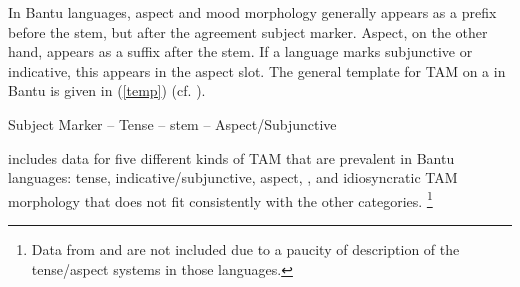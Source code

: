 \documentclass[output=paper,
modfonts
]{langscibook}
\begin{document}
  In Bantu languages, aspect and mood morphology generally appears as a prefix before the  stem, but after the agreement subject marker.  Aspect, on the other hand, appears as a suffix after the  stem. If a language marks subjunctive or indicative, this appears in the aspect slot. The general template for TAM on a  in Bantu is given in (\ref{temp}) (cf. \citealt{Meeussen1967,Nurse2003}).
  \begin{exe}
\ex\label{temp} Subject Marker -- Tense -- {\sc stem} -- Aspect/Subjunctive
\end{exe}
%
 includes data for five different kinds of TAM that are prevalent in Bantu languages: tense, indicative/subjunctive, aspect, , and idiosyncratic TAM morphology that does not fit consistently with the other categories.%
\footnote{Data from  and  are not included due to a paucity of description of the tense/aspect systems in those languages.} \\
\end{document}
